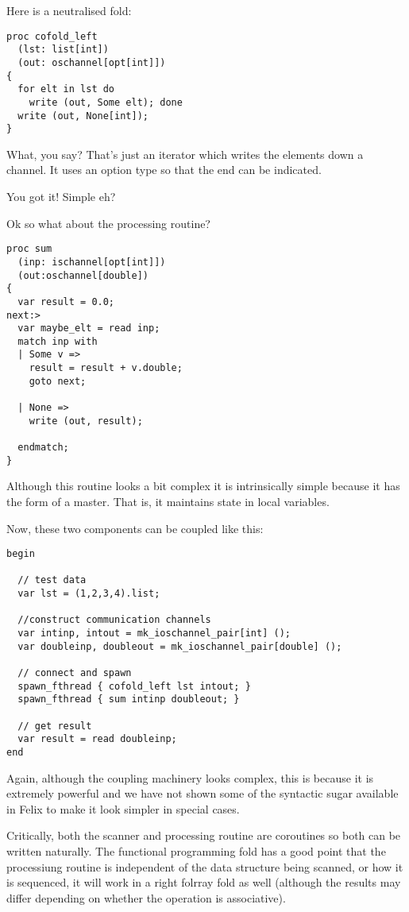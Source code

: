 \documentclass{article}
\begin{document}
Here is a neutralised fold:

\begin{verbatim}
proc cofold_left 
  (lst: list[int])
  (out: oschannel[opt[int]])
{
  for elt in lst do 
    write (out, Some elt); done
  write (out, None[int]);
}
\end{verbatim}

What, you say? That's just an iterator which writes
the elements down a channel. It uses an option type
so that the end can be indicated.

You got it! Simple eh?

Ok so what about the processing routine?

\begin{verbatim}
proc sum 
  (inp: ischannel[opt[int]])
  (out:oschannel[double]) 
{
  var result = 0.0;
next:>
  var maybe_elt = read inp;
  match inp with
  | Some v =>
    result = result + v.double;
    goto next;

  | None => 
    write (out, result);

  endmatch;
}
\end{verbatim}

Although this routine looks a bit complex it is intrinsically simple
because it has the form of a master. That is, it maintains state
in local variables.

Now, these two components can be coupled like this:

\begin{verbatim}
begin

  // test data
  var lst = (1,2,3,4).list;

  //construct communication channels
  var intinp, intout = mk_ioschannel_pair[int] ();
  var doubleinp, doubleout = mk_ioschannel_pair[double] ();

  // connect and spawn
  spawn_fthread { cofold_left lst intout; }
  spawn_fthread { sum intinp doubleout; }
  
  // get result
  var result = read doubleinp;
end
\end{verbatim}

Again, although the coupling machinery looks complex, this is because
it is extremely powerful and we have not shown some of the syntactic
sugar available in Felix to make it look simpler in special cases.

Critically, both the scanner and processing routine are coroutines
so both can be written naturally. The functional programming fold
has a good point that the processiung routine is independent
of the data structure being scanned, or how it is sequenced,
it will work in a right folrray fold as well (although
the results may differ depending on whether the operation
is associative).
\end{document}
